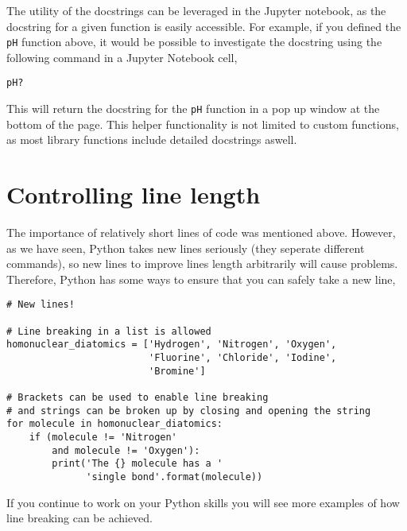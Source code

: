\documentclass[a4paper]{article}
\begin{document}
The utility of the docstrings can be leveraged in the Jupyter notebook, as the docstring for a given function is easily accessible.
For example, if you defined the \texttt{pH} function above, it would be possible to investigate the docstring using the following command in a Jupyter Notebook cell,
\begin{lstlisting}
pH?
\end{lstlisting}
This will return the docstring for the \texttt{pH} function in a pop up window at the bottom of the page.
This helper functionality is not limited to custom functions, as most library functions include detailed docstrings aswell.

\vspace{\baselineskip}
\begin{center}
	\noindent{}
\end{center}

\section{Controlling line length}
The importance of relatively short lines of code was mentioned above. 
However, as we have seen, Python takes new lines seriously (they seperate different commands), so new lines to improve lines length arbitrarily will cause problems. 
Therefore, Python has some ways to ensure that you can safely take a new line, 
\begin{lstlisting}
# New lines!

# Line breaking in a list is allowed
homonuclear_diatomics = ['Hydrogen', 'Nitrogen', 'Oxygen', 
                         'Fluorine', 'Chloride', 'Iodine', 
                         'Bromine']

# Brackets can be used to enable line breaking
# and strings can be broken up by closing and opening the string
for molecule in homonuclear_diatomics:
    if (molecule != 'Nitrogen' 
        and molecule != 'Oxygen'):
        print('The {} molecule has a '
              'single bond'.format(molecule))
\end{lstlisting}
If you continue to work on your Python skills you will see more examples of how line breaking can be achieved. 
\end{document}
